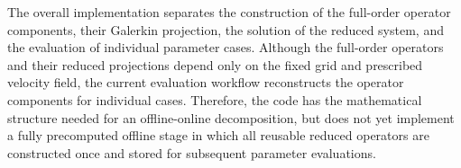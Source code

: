 The overall implementation separates the construction of
the full-order operator components, their Galerkin
projection, the solution of the reduced system, and the
evaluation of individual parameter cases. Although the
full-order operators and their reduced projections depend
only on the fixed grid and prescribed velocity field, the
current evaluation workflow reconstructs the operator
components for individual cases. Therefore, the code has
the mathematical structure needed for an offline-online
decomposition, but does not yet implement a fully
precomputed offline stage in which all reusable reduced
operators are constructed once and stored for subsequent
parameter evaluations.